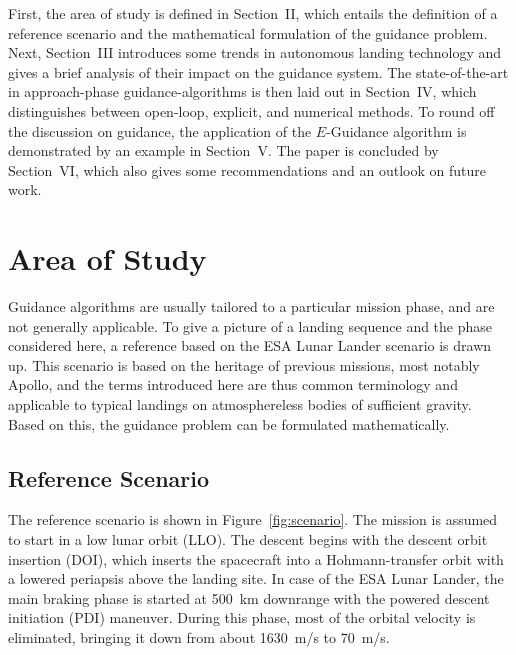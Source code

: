 \documentclass[%
]{aiaa-tc}
\begin{document}
First, the area of study is defined in Section~II, which entails the definition of
a reference scenario and the mathematical formulation of the guidance problem.
Next, Section~III introduces some trends in autonomous landing technology and
gives a brief analysis of their impact on the guidance system. The
state-of-the-art in approach-phase guidance-algorithms is then laid out in
Section~IV, which distinguishes between open-loop, explicit, and numerical
methods. To round off the discussion on guidance, the application of the
$E$-Guidance algorithm is demonstrated by an example in Section~V. The paper is
concluded by Section~VI, which also gives some recommendations and an outlook on
future work.


\section{Area of Study}

Guidance algorithms are usually tailored to a particular mission phase, and are
not generally applicable. To give a picture of a landing sequence and the phase
considered here, a reference based on the ESA Lunar Lander scenario is drawn
up.\cite{Fisackerly2012} This scenario is based on the heritage of previous
missions, most notably Apollo,\cite{Klumpp1974} and the terms introduced here
are thus common terminology and applicable to typical landings on atmosphereless
bodies of sufficient gravity.\cite{Paschall2009} Based on this, the guidance
problem can be formulated mathematically.


\subsection{Reference Scenario}

The reference scenario is shown in Figure~\ref{fig:scenario}. The mission is
assumed to start in a low lunar orbit (LLO). The descent begins with the descent
orbit insertion (DOI), which inserts the spacecraft into a Hohmann-transfer
orbit with a lowered periapsis above the landing site. In case of the ESA Lunar
Lander, the main braking phase is started at \SI{500}{km} downrange with the
powered descent initiation (PDI) maneuver. During this phase, most of the
orbital velocity is eliminated, bringing it down from about \SI{1630}{m/s} to
\SI{70}{m/s}. 

\end{document}
